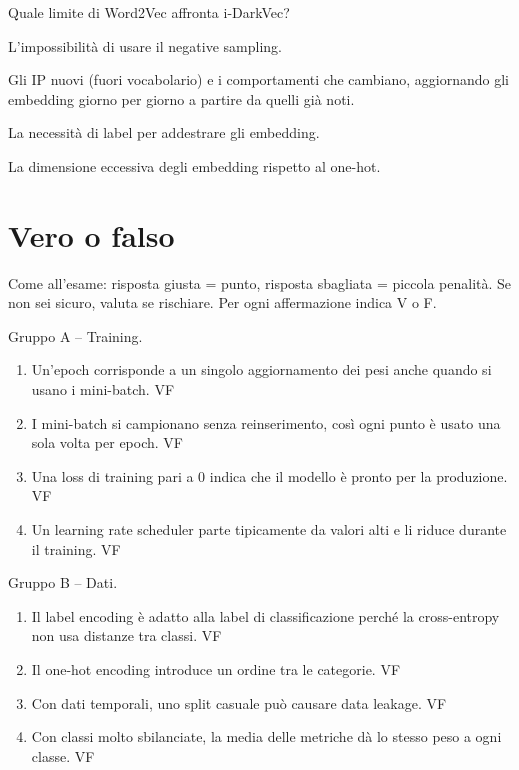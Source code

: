 \begin{domanda}[i-DarkVec]\label{quiz:m51}
Quale limite di Word2Vec affronta i-DarkVec?
\begin{opzioni}
  \item L'impossibilità di usare il negative sampling.
  \item Gli IP nuovi (fuori vocabolario) e i comportamenti che cambiano, aggiornando gli embedding giorno per giorno a partire da quelli già noti.
  \item La necessità di label per addestrare gli embedding.
  \item La dimensione eccessiva degli embedding rispetto al one-hot.
\end{opzioni}
\end{domanda}

\section{Vero o falso}
Come all'esame: risposta giusta = punto, risposta sbagliata = piccola penalità. Se non sei sicuro,
valuta se rischiare. Per ogni affermazione indica V o F.

\begin{domanda}\label{quiz:vfA}
Gruppo A -- Training.
\begin{enumerate}[label=A\arabic*.,nosep,leftmargin=2.6em]
  \item Un'epoch corrisponde a un singolo aggiornamento dei pesi anche quando si usano i mini-batch. \hfill V\quad F
  \item I mini-batch si campionano senza reinserimento, così ogni punto è usato una sola volta per epoch. \hfill V\quad F
  \item Una loss di training pari a 0 indica che il modello è pronto per la produzione. \hfill V\quad F
  \item Un learning rate scheduler parte tipicamente da valori alti e li riduce durante il training. \hfill V\quad F
\end{enumerate}
\end{domanda}

\begin{domanda}\label{quiz:vfB}
Gruppo B -- Dati.
\begin{enumerate}[label=B\arabic*.,nosep,leftmargin=2.6em]
  \item Il label encoding è adatto alla label di classificazione perché la cross-entropy non usa distanze tra classi. \hfill V\quad F
  \item Il one-hot encoding introduce un ordine tra le categorie. \hfill V\quad F
  \item Con dati temporali, uno split casuale può causare data leakage. \hfill V\quad F
  \item Con classi molto sbilanciate, la media  delle metriche dà lo stesso peso a ogni classe. \hfill V\quad F
\end{enumerate}
\end{domanda}

